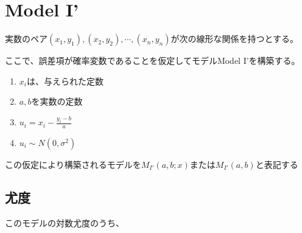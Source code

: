 \section{Model I'}
実数のペア$(x_1,y_1),(x_2,y_2),\cdots,(x_n,y_n)$が次の線形な関係を持つとする。

ここで、誤差項が確率変数であることを仮定してモデルModel I'を構築する。
\begin{enumerate}
 \item $x_i$は、与えられた定数
 \item $a,b$を実数の定数
 \item $u_i = x_i -\frac{y_i-b}{a}$
 \item $u_i \sim N(0,\sigma^2)$
\end{enumerate}
この仮定により構築されるモデルを$M_{I'}(a,b; x)$または$M_{I'}(a,b)$と表記する

\subsection{尤度}
このモデルの対数尤度のうち、
\fi

